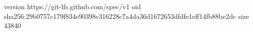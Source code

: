 version https://git-lfs.github.com/spec/v1
oid sha256:29b0757c179f834e90398c316228c7a4da36d1672653dfdfe1eff14fb88be2dc
size 43840
